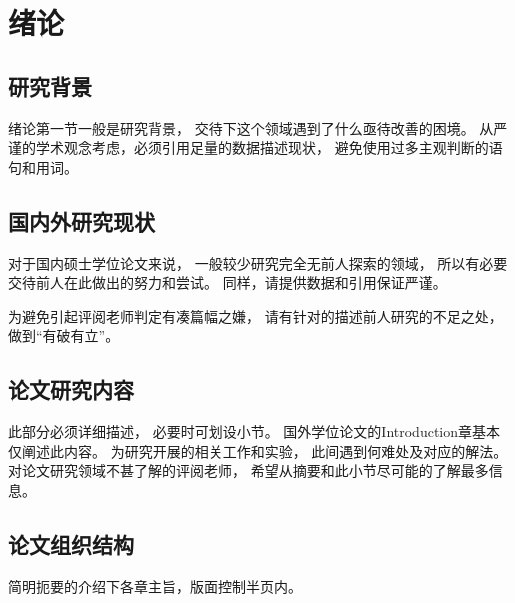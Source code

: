 

\chapter{绪论}

\section{研究背景}

绪论第一节一般是研究背景，
交待下这个领域遇到了什么亟待改善的困境。
从严谨的学术观念考虑，必须引用足量的数据描述现状，
避免使用过多主观判断的语句和用词。

\section{国内外研究现状}

对于国内硕士学位论文来说，
一般较少研究完全无前人探索的领域，
所以有必要交待前人在此做出的努力和尝试。
同样，请提供数据和引用保证严谨。

为避免引起评阅老师判定有凑篇幅之嫌，
请有针对的描述前人研究的不足之处，
做到``有破有立''。

\section{论文研究内容}

此部分必须详细描述，
必要时可划设小节。
国外学位论文的Introduction章基本仅阐述此内容。
为研究开展的相关工作和实验，
此间遇到何难处及对应的解法。
对论文研究领域不甚了解的评阅老师，\cite{kanamori1998}
希望从摘要和此小节尽可能的了解最多信息。


\section{论文组织结构}

简明扼要的介绍下各章主旨，版面控制半页内。
